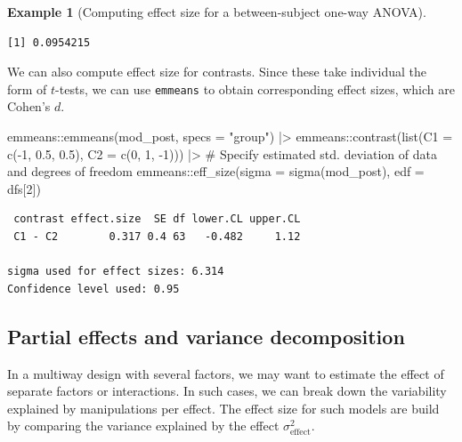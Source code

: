 \documentclass[
  11pt,
  letterpaper,
]{scrbook}
\newenvironment{Shaded}{\begin{snugshade}}{\end{snugshade}}
\newcommand{\AttributeTok}[1]{\textcolor[rgb]{0.40,0.45,0.13}{#1}}
\newcommand{\CommentTok}[1]{\textcolor[rgb]{0.37,0.37,0.37}{#1}}
\newcommand{\DecValTok}[1]{\textcolor[rgb]{0.68,0.00,0.00}{#1}}
\newcommand{\FloatTok}[1]{\textcolor[rgb]{0.68,0.00,0.00}{#1}}
\newcommand{\FunctionTok}[1]{\textcolor[rgb]{0.28,0.35,0.67}{#1}}
\newcommand{\NormalTok}[1]{\textcolor[rgb]{0.00,0.23,0.31}{#1}}
\newcommand{\SpecialCharTok}[1]{\textcolor[rgb]{0.37,0.37,0.37}{#1}}
\newcommand{\StringTok}[1]{\textcolor[rgb]{0.13,0.47,0.30}{#1}}
\theoremstyle{definition}
\newtheorem{example}{Example}[chapter]
\theoremstyle{definition}
\theoremstyle{remark}
\begin{document}
\begin{example}[Computing effect size for a between-subject one-way
ANOVA]
\begin{verbatim}
[1] 0.0954215
\end{verbatim}

We can also compute effect size for contrasts. Since these take
individual the form of \(t\)-tests, we can use \texttt{emmeans} to
obtain corresponding effect sizes, which are Cohen's \(d\).

\begin{Shaded}
\begin{Highlighting}[]
\NormalTok{emmeans}\SpecialCharTok{::}\FunctionTok{emmeans}\NormalTok{(mod\_post, }\AttributeTok{specs =} \StringTok{"group"}\NormalTok{) }\SpecialCharTok{|\textgreater{}} 
\NormalTok{  emmeans}\SpecialCharTok{::}\FunctionTok{contrast}\NormalTok{(}\FunctionTok{list}\NormalTok{(}\AttributeTok{C1 =} \FunctionTok{c}\NormalTok{(}\SpecialCharTok{{-}}\DecValTok{1}\NormalTok{, }\FloatTok{0.5}\NormalTok{, }\FloatTok{0.5}\NormalTok{), }
                         \AttributeTok{C2 =} \FunctionTok{c}\NormalTok{(}\DecValTok{0}\NormalTok{, }\DecValTok{1}\NormalTok{, }\SpecialCharTok{{-}}\DecValTok{1}\NormalTok{))) }\SpecialCharTok{|\textgreater{}}
\CommentTok{\# Specify estimated std. deviation of data and degrees of freedom }
\NormalTok{  emmeans}\SpecialCharTok{::}\FunctionTok{eff\_size}\NormalTok{(}\AttributeTok{sigma =} \FunctionTok{sigma}\NormalTok{(mod\_post), }\AttributeTok{edf =}\NormalTok{ dfs[}\DecValTok{2}\NormalTok{])}
\end{Highlighting}
\end{Shaded}

\begin{verbatim}
 contrast effect.size  SE df lower.CL upper.CL
 C1 - C2        0.317 0.4 63   -0.482     1.12

sigma used for effect sizes: 6.314 
Confidence level used: 0.95 
\end{verbatim}

\end{example}

\subsection{Partial effects and variance
decomposition}\label{partial-effects-and-variance-decomposition}

In a multiway design with several factors, we may want to estimate the
effect of separate factors or interactions. In such cases, we can break
down the variability explained by manipulations per effect. The effect
size for such models are build by comparing the variance explained by
the effect \(\sigma^2_{\text{effect}}\).
\end{document}
